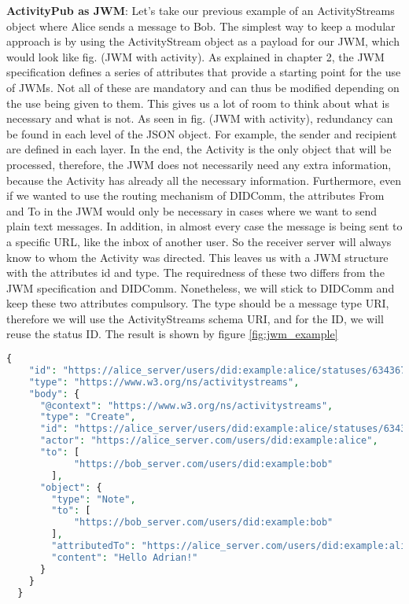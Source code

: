 \textbf{ActivityPub as JWM}: Let's take our previous example of an ActivityStreams object where Alice sends a message to Bob. The simplest way to keep a modular approach is by using the ActivityStream object as a payload for our JWM, which would look like fig. (JWM with activity). As explained in chapter 2, the JWM specification defines a series of attributes that provide a starting point for the use of JWMs. Not all of these are mandatory and can thus be modified depending on the use being given to them. This gives us a lot of room to think about what is necessary and what is not. As seen in fig. (JWM with activity), redundancy can be found in each level of the JSON object. For example, the sender and recipient are defined in each layer. In the end, the Activity is the only object that will be processed, therefore, the JWM does not necessarily need any extra information, because the Activity has already all the necessary information. Furthermore, even if we wanted to use the routing mechanism of DIDComm, the attributes From and To in the JWM would only be necessary in cases where we want to send plain text messages. In addition, in almost every case the message is being sent to a specific URL, like the inbox of another user. So the receiver server will always know to whom the Activity was directed. This leaves us with a JWM structure with the attributes id and type. The requiredness of these two differs from the JWM specification and DIDComm. Nonetheless, we will stick to DIDComm and keep these two attributes compulsory. The type should be a message type URI, therefore we will use the ActivityStreams schema URI, and for the ID, we will reuse the status ID. The result is shown by figure \ref{fig:jwm_example}

\lstset{style=JSONStyle}
\begin{lstlisting}[language=PHP, caption=JWM example, label=fig:jwm_example, float=h]
  {
    "id": "https://alice_server/users/did:example:alice/statuses/634367/activity",
    "type": "https://www.w3.org/ns/activitystreams",
    "body": {
      "@context": "https://www.w3.org/ns/activitystreams",
      "type": "Create",
      "id": "https://alice_server/users/did:example:alice/statuses/634367/activity",
      "actor": "https://alice_server.com/users/did:example:alice",
      "to": [ 
            "https://bob_server.com/users/did:example:bob"
        ],
      "object": {
        "type": "Note",
        "to": [ 
            "https://bob_server.com/users/did:example:bob"
        ],
        "attributedTo": "https://alice_server.com/users/did:example:alice",
        "content": "Hello Adrian!"
      }
    }
  }
\end{lstlisting}


